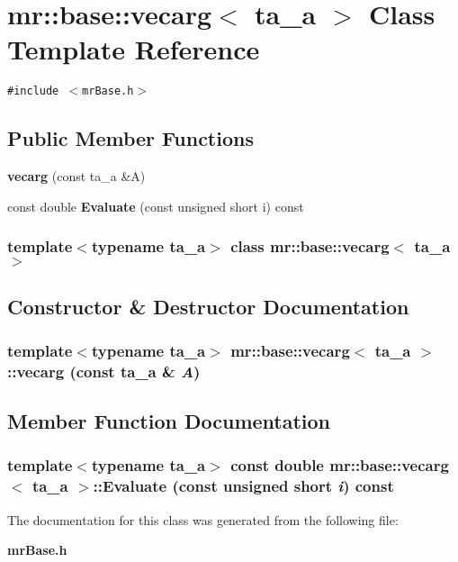 \section{mr::base::vecarg$<$ ta\_\-a $>$ Class Template Reference}
\label{classmr_1_1base_1_1vecarg}
{\tt \#include $<$mr\-Base.h$>$}

\subsection*{Public Member Functions}
\begin{CompactItemize}
\item 
{\bf vecarg} (const ta\_\-a \&A)
\item 
const double {\bf Evaluate} (const unsigned short i) const 
\end{CompactItemize}
\subsubsection*{template$<$typename ta\_\-a$>$ class mr::base::vecarg$<$ ta\_\-a $>$}



\subsection{Constructor \& Destructor Documentation}
\subsubsection{\setlength{\rightskip}{0pt plus 5cm}template$<$typename ta\_\-a$>$ {\bf mr::base::vecarg}$<$ ta\_\-a $>$::{\bf vecarg} (const ta\_\-a \& {\em A})\hspace{0.3cm}{\tt  [inline]}}\label{classmr_1_1base_1_1vecarg_a0}




\subsection{Member Function Documentation}
\subsubsection{\setlength{\rightskip}{0pt plus 5cm}template$<$typename ta\_\-a$>$ const double {\bf mr::base::vecarg}$<$ ta\_\-a $>$::Evaluate (const unsigned short {\em i}) const\hspace{0.3cm}{\tt  [inline]}}\label{classmr_1_1base_1_1vecarg_a1}




The documentation for this class was generated from the following file:\begin{CompactItemize}
\item 
{\bf mr\-Base.h}\end{CompactItemize}
